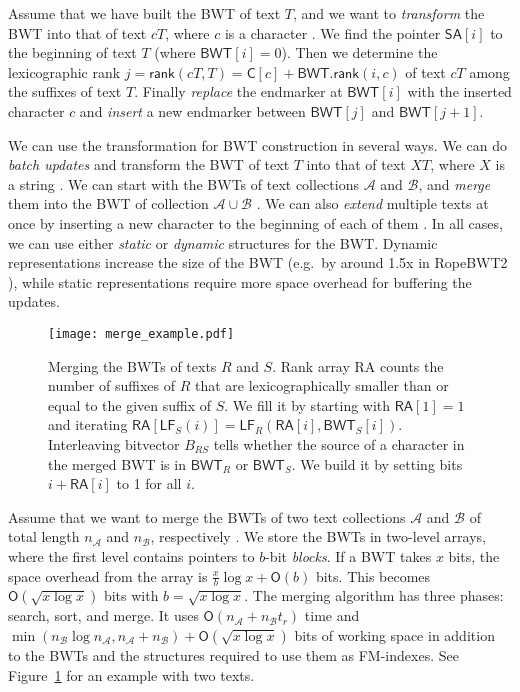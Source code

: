 \documentclass[smallabstract,smallcaptions]{dccpaper}
\newcommand{\Oh}{\ensuremath{\mathsf{O}}}
\newcommand{\BWT}{\textsf{BWT}}
\newcommand{\RA}{\textsf{RA}}
\newcommand{\mSA}{\ensuremath{\mathsf{SA}}}
\newcommand{\mBWT}{\ensuremath{\mathsf{BWT}}}
\newcommand{\mC}{\ensuremath{\mathsf{C}}}
\newcommand{\mRA}{\ensuremath{\mathsf{RA}}}
\newcommand{\mLF}{\ensuremath{\mathsf{LF}}}
\newcommand{\mrank}{\ensuremath{\mathsf{rank}}}
\newcommand{\Acoll}{\ensuremath{\mathcal{A}}}
\newcommand{\Bcoll}{\ensuremath{\mathcal{B}}}
\newcommand{\ropebwtii}{\textsf{RopeBWT2}}
\begin{document}
Assume that we have built the \BWT{} of text $T$, and we want to \emph{transform} the \BWT{} into that of text $cT$, where $c$ is a character \cite{Hon2007}. We find the pointer $\mSA[i]$ to the beginning of text $T$ (where $\mBWT[i] = 0$). Then we determine the lexicographic rank $j = \mrank(cT, T) = \mC[c] + \mBWT.\mrank(i, c)$ of text $cT$ among the suffixes of text $T$. Finally \emph{replace} the endmarker at $\mBWT[i]$ with the inserted character $c$ and \emph{insert} a new endmarker between $\mBWT[j]$ and $\mBWT[j+1]$.

We can use the transformation for \BWT{} construction in several ways. We can do \emph{batch updates} and transform the \BWT{} of text $T$ into that of text $XT$, where $X$ is a string \cite{Hon2007}. We can start with the \BWT{}s of text collections $\Acoll$ and $\Bcoll$, and \emph{merge} them into the \BWT{} of collection $\Acoll \cup \Bcoll$ \cite{Siren2009}. We can also \emph{extend} multiple texts at once by inserting a new character to the beginning of each of them \cite{Bauer2013}. In all cases, we can use either \emph{static} or \emph{dynamic} \cite{Chan2007} structures for the \BWT. Dynamic representations increase the size of the \BWT{} (e.g.~by around 1.5x in \ropebwtii{} \cite{Li2014a}), while static representations require more space overhead for buffering the updates.

\begin{figure}[t!]
\texttt{[image: merge\_example.pdf]}
\caption{Merging the \BWT{}s of texts $R$ and $S$. Rank array \RA{} counts the number of suffixes of $R$ that are lexicographically smaller than or equal to the given suffix of $S$. We fill it by starting with $\mRA[1] = 1$ and iterating $\mRA[\mLF_{S}(i)] = \mLF_{R}(\mRA[i], \mBWT_{S}[i])$. Interleaving bitvector $B_{RS}$ tells whether the source of a character in the merged \BWT{} is in $\mBWT_{R}$ or $\mBWT_{S}$. We build it by setting bits $i+\mRA[i]$ to 1 for all $i$.}\label{fig:merge}%
\vspace{-6pt}
\end{figure}

Assume that we want to merge the \BWT{}s of two text collections $\Acoll$ and $\Bcoll$ of total length $n_{\Acoll}$ and $n_{\Bcoll}$, respectively \cite{Siren2009}. We store the \BWT{}s in two-level arrays, where the first level contains pointers to $b$\nobreakdash-bit \emph{blocks}. If a \BWT{} takes $x$ bits, the space overhead from the array is $\frac{x}{b} \log x + \Oh(b)$ bits. This becomes $\Oh(\sqrt{x \log x})$ bits with $b = \sqrt{x \log x}$. The merging algorithm has three phases: search, sort, and merge. It uses $\Oh(n_{\Acoll} + n_{\Bcoll} t_{r})$ time and $\min(n_{\Bcoll} \log n_{\Acoll}, n_{\Acoll} + n_{\Bcoll}) + \Oh(\sqrt{x \log x})$ bits of working space in addition to the \BWT{}s and the structures required to use them as FM-indexes. See Figure~\ref{fig:merge} for an example with two texts.
\end{document}
